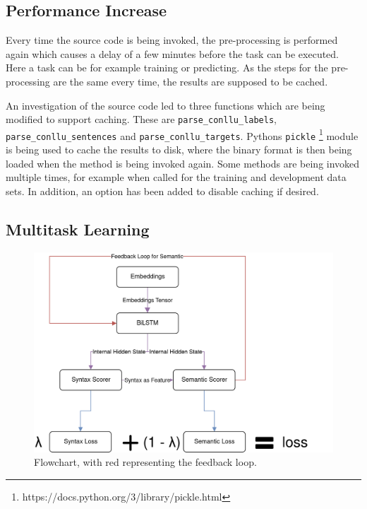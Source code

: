 \documentclass[11pt]{scrartcl}
\begin{document}
\subsection{Performance Increase}

Every time the source code is being invoked, the pre-processing is performed again which causes a delay of a few minutes before the task can be executed. Here a task can be for example training or predicting. As the steps for the pre-processing are the same every time, the results are supposed to be cached.

An investigation of the source code led to three functions which are being modified to support caching. These are \texttt{parse\_conllu\_labels}, \texttt{parse\_conllu\_sentences} and \texttt{parse\_conllu\_targets}. Pythons \texttt{pickle} \footnote{https://docs.python.org/3/library/pickle.html} module is being used to cache the results to disk, where the binary format is then being loaded when the method is being invoked again. Some methods are being invoked multiple times, for example when called for the training and development data sets. In addition, an option has been added to disable caching if desired.

\subsection{Multitask Learning}

\begin{figure}[hbt]
	\center
	\includegraphics[width=1.0\textwidth]{img/flowchart}
	\caption{Flowchart, with red representing the feedback loop.}
	\label{fig:flowchart}
\end{figure}
\end{document}
